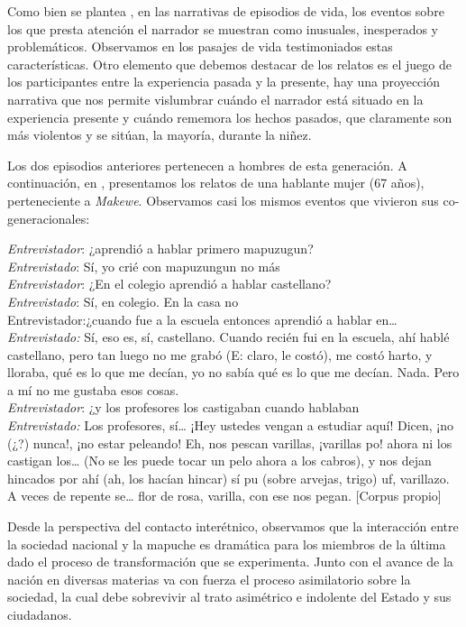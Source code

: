 \documentclass[output=paper]{../langscibook}
\begin{document}
Como bien se plantea \citet{Ochs2006}, en las narrativas de episodios de vida, los eventos sobre los que  presta atención el narrador se muestran como inusuales, inesperados y problemáticos. Observamos en los pasajes de vida testimoniados estas características. Otro elemento que debemos destacar de los relatos es el juego de los participantes entre la experiencia pasada y la presente, hay una proyección narrativa que nos permite vislumbrar cuándo el narrador está situado en la experiencia presente y cuándo rememora los hechos pasados, que claramente son más violentos y se sitúan, la mayoría, durante la niñez.

Los dos episodios anteriores pertenecen a hombres de esta generación. A continuación, en , presentamos los relatos de una hablante mujer (67 años), perteneciente a \textit{Makewe}. Observamos casi los mismos eventos que vivieron sus co-generacionales:


\ea\label{ex:olate:8}
 \emph{Entrevistador}: ¿aprendió a hablar primero mapuzugun?\\
 \emph{Entrevistado}: Sí, yo crié con mapuzungun no más\\
 \emph{Entrevistador}: ¿En el colegio aprendió a hablar castellano? \\
 \emph{Entrevistado}: Sí, en colegio. En la casa no\\
 Entrevistador:¿cuando fue a la escuela entonces aprendió a hablar en…\\
 \emph{Entrevistado:}  Sí, eso es, sí, castellano. Cuando recién fui en la escuela, ahí hablé castellano, pero tan luego no me grabó (E: claro, le costó), me costó harto, y lloraba, qué es lo que me decían, yo no sabía qué es lo que me decían. Nada. Pero a mí no me gustaba esos cosas.\\
 \emph{Entrevistador}: ¿y los profesores los castigaban cuando hablaban\\
 \emph{Entrevistado:} Los profesores, sí… ¡Hey ustedes vengan a estudiar aquí! Dicen, ¡no (¿?) nunca!, ¡no estar peleando! Eh, nos pescan varillas, ¡varillas po! ahora ni los castigan los… (No se les puede tocar un pelo ahora a los cabros), y nos dejan hincados por ahí (ah, los hacían hincar) sí pu (sobre arvejas, trigo) uf, varillazo. A veces de repente se… flor de rosa, varilla, con ese nos pegan. \textup{[Corpus propio]}\\
\z

Desde la perspectiva del contacto interétnico, observamos que la interacción entre la sociedad nacional y la mapuche es dramática para los miembros de la última dado el proceso de transformación que se experimenta. Junto con el avance de la nación en diversas materias va con fuerza el proceso asimilatorio sobre la sociedad, la cual debe sobrevivir al trato asimétrico e indolente del Estado y sus ciudadanos.
\end{document}
